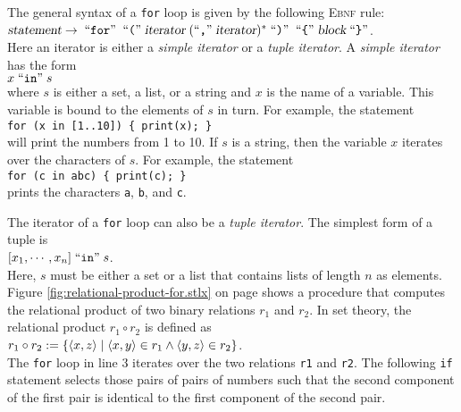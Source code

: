 The general syntax of a \texttt{for} loop is given by the following \textsc{Ebnf} rule:
\\[0.2cm]
\hspace*{1.3cm}
$\textsl{statement} \rightarrow \;\mbox{``\texttt{for}''}\; \;\mbox{``\texttt{(}''}\; \textsl{iterator} \;(\mbox{``\texttt{,}''}\; \textsl{iterator})^* \;\mbox{``\texttt{)}''}\;
  \;\mbox{``\texttt{\{}''}\; \textsl{block} \;\mbox{``\texttt{\}}''}
$.
\\[0.2cm]
Here an iterator is either a \emph{simple iterator} or a \emph{tuple iterator}.  A
\emph{simple iterator} has the form
\\[0.2cm]
\hspace*{1.3cm}
$x \;\mbox{``\texttt{in}''}\; s$
\\[0.2cm]
where $s$ is either a set, a list, or a string and $x$ is the name of a variable.
This variable is bound to the elements of $s$ in turn.  For example,  the statement
\\[0.2cm]
\hspace*{1.3cm}
\texttt{for (x in [1..10]) \{ print(x); \}}
\\[0.2cm]
will print the numbers from 1 to 10.  If $s$ is a string, then the variable $x$ iterates over the
characters of $s$.  For example, the statement
\\[0.2cm]
\hspace*{1.3cm}
\texttt{for (c in abc) \{ print(c); \}}
\\[0.2cm]
prints the characters \texttt{a}, \texttt{b},
and \texttt{c}.  


The iterator of a \texttt{for} loop can also be a \emph{tuple iterator}.  The simplest form of
a tuple is
\\[0.2cm]
\hspace*{1.3cm}
 $[x_1, \cdots, x_n] \;\mbox{``\texttt{in}''}\; s$.
\\[0.2cm]
Here, $s$ must be either a set or a list that contains lists of length $n$ as elements. 
Figure \ref{fig:relational-product-for.stlx} on page \pageref{fig:relational-product-for.stlx}
shows a procedure that computes the relational product 
of two binary relations $r_1$ and $r_2$.  In set theory, the relational product $r_1 \circ r_2$
is defined as
\\[0.2cm]
\hspace*{1.3cm}
$r_1 \circ r_2 := \{ \pair(x,z) \mid \pair(x,y) \in r_1 \wedge \pair(y,z) \in r_2 \}$.
\\[0.2cm]
The \texttt{for} loop in line 3 iterates over the two relations \texttt{r1} and \texttt{r2}.
The following \texttt{if} statement selects those pairs of pairs of numbers such that the second
component of the first pair is identical to the first component of the second pair.

